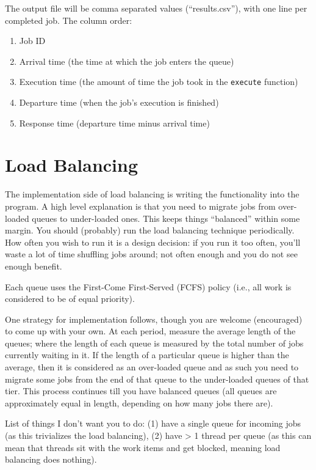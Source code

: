 \documentclass[letterpaper,10pt]{article}
\begin{document}
The output file will be comma separated values (``results.csv''), with one line per completed job. The column order:
\begin{enumerate}
	\item Job ID
	\item Arrival time (the time at which the job enters the queue)
	\item Execution time (the amount of time the job took in the \texttt{execute} function)
	\item Departure time (when the job's execution is finished)
	\item Response time (departure time minus arrival time)
\end{enumerate}


\section*{Load Balancing}

The implementation side of load balancing is writing the functionality into the program. A high level explanation is that you need to migrate jobs from over-loaded queues to under-loaded ones. This keeps things ``balanced'' within some margin. You should (probably) run the load balancing technique periodically. How often you wish to run it is a design decision: if you run it too often, you'll waste a lot of time shuffling jobs around; not often enough and you do not see enough benefit.

Each queue uses the First-Come First-Served (FCFS) policy (i.e., all work is considered to be of equal priority).

One strategy for implementation follows, though you are welcome (encouraged) to come up with your own. At each period, measure the average length of the queues; where the length of each queue is measured by the total number of jobs currently waiting in it. If the length of a particular queue is higher than the average, then it is considered as an over-loaded queue and as such you need to migrate some jobs from the end of that queue to the under-loaded queues of that tier. This process continues till you have balanced queues (all queues are approximately equal in length, depending on how many jobs there are).

List of things I don't want you to do: (1) have a single queue for incoming jobs (as this trivializes the load balancing), (2) have > 1 thread per queue (as this can mean that threads sit with the work items and get blocked, meaning load balancing does nothing).
\end{document}
